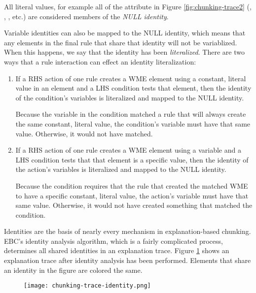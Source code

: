 All literal values, for example all of the attribute in Figure \ref{fig:chunking-trace2} (, , , etc.) are considered members of the \textit{NULL identity}.

Variable identities can also be mapped to the NULL identity, which means that any elements in the final rule that share that identity will not be variablized. When this happens, we say that the identity has been \textit{literalized}.  There are two ways that a rule interaction can effect an identity literalization:

\begin{enumerate}
	\item If a RHS action of one rule creates a WME element using a constant, literal value in an element and a LHS condition tests that element, then the identity of the condition's variables is literalized and mapped to the NULL identity. 

	Because the variable in the condition matched a rule that will always create the same constant, literal value, the condition's variable must have that same value.  Otherwise, it would not have matched.
	
	
	\item If a RHS action of one rule creates a WME element using a variable and a LHS condition tests that that element is a specific value, then the identity of the action's variables is literalized and mapped to the NULL identity. 

	Because the condition requires that the rule that created the matched WME to have a specific constant, literal value, the action's variable must have that same value.  Otherwise, it would not have created something that matched the condition. 
\end{enumerate}

Identities are the basis of nearly every mechanism in explanation-based chunking.  EBC's identity analysis algorithm, which is a fairly complicated process, determines all shared identities in an explanation trace.  Figure \ref{fig:chunking-trace-identity} shows an explanation trace after identity analysis has been performed.  Elements that share an identity in the figure are colored the same.

\vspace{12pt}
\begin{figure}[!h]
	\centering
	\texttt{[image: chunking-trace-identity.png]}
	\label{fig:chunking-trace-identity}
\end{figure}


